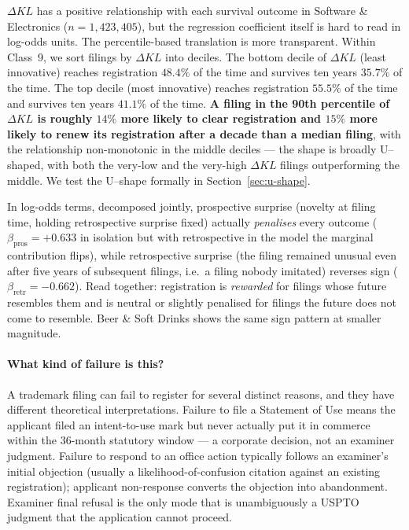 \documentclass[11pt]{article}
\begin{document}
$\Delta KL$ has a positive relationship with each survival outcome
in Software \& Electronics ($n = 1{,}423{,}405$), but the regression
coefficient itself is hard to read in log-odds units. The
percentile-based translation is more transparent. Within Class~9, we
sort filings by $\Delta KL$ into deciles. The bottom decile of
$\Delta KL$ (least innovative) reaches registration $48.4\%$ of the
time and survives ten years $35.7\%$ of the time. The top decile
(most innovative) reaches registration $55.5\%$ of the time and
survives ten years \textbf{$41.1\%$} of the time. \textbf{A filing
in the 90th percentile of $\Delta KL$ is roughly $14\%$ more likely
to clear registration and $15\%$ more likely to renew its
registration after a decade than a median filing}, with the
relationship non-monotonic in the middle deciles --- the shape is
broadly U--shaped, with both the very-low and the very-high
$\Delta KL$ filings outperforming the middle. We test the
U--shape formally in Section~\ref{sec:u-shape}.

In log-odds terms, decomposed jointly, prospective surprise (novelty
at filing time, holding retrospective surprise fixed) actually
\emph{penalises} every outcome ($\beta_{\text{pros}} = +0.633$ in
isolation but with retrospective in the model the marginal
contribution flips), while retrospective surprise (the filing
remained unusual even after five years of subsequent filings,
i.e.\ a filing nobody imitated) reverses sign
($\beta_{\text{retr}} = -0.662$). Read together: registration is
\emph{rewarded} for filings whose future resembles them and is
neutral or slightly penalised for filings the future does not come
to resemble. Beer \& Soft Drinks shows the same sign pattern at
smaller magnitude.

\paragraph{What kind of failure is this?}
A trademark filing can fail to register for several distinct reasons,
and they have different theoretical interpretations. Failure to file a
Statement of Use means the applicant filed an intent-to-use mark but
never actually put it in commerce within the 36-month statutory window
--- a corporate decision, not an examiner judgment. Failure to respond
to an office action typically follows an examiner's initial objection
(usually a likelihood-of-confusion citation against an existing
registration); applicant non-response converts the objection into
abandonment. Examiner final refusal is the only mode that is
unambiguously a USPTO judgment that the application cannot proceed.
\end{document}
